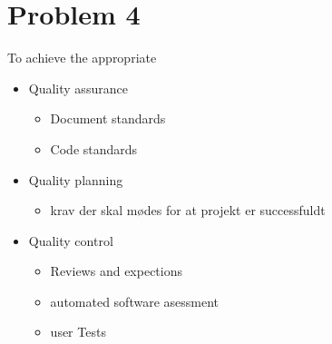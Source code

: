 \chapter{Problem 4}
To achieve the appropriate 
\begin{itemize}
	\setlength\itemsep{0.1em}
	\item Quality assurance
	\begin{itemize}
		\item Document standards
		\item Code standards
	\end{itemize}
	\item Quality planning
	\begin{itemize}
		\item krav der skal mødes for at projekt er successfuldt
	\end{itemize}
	\item Quality control
	\begin{itemize}
		\item Reviews and expections
		\item automated software asessment
		\item user Tests
	\end{itemize}
\end{itemize}